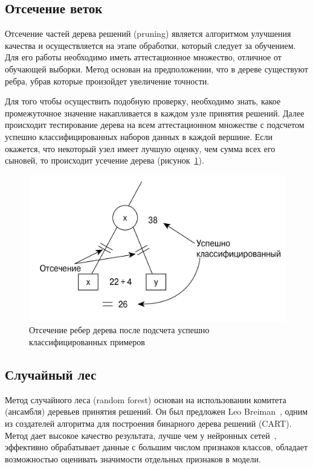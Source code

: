 \documentclass[a4paper,14pt]{extarticle} %
\begin{document}
\subsection{Отсечение веток}
\hspace{\parindent} Отсечение частей дерева решений (pruning) является алгоритмом улучшения качества и осуществляется на этапе обработки, который следует за обучением. Для его работы необходимо иметь аттестационное множество, отличное от обучающей выборки. Метод основан на предположении, что в дереве существуют ребра, убрав которые произойдет увеличение точности.

Для того чтобы осуществить подобную проверку, необходимо знать, какое промежуточное значение накапливается в каждом узле принятия решений. Далее происходит тестирование дерева на всем аттестационном множестве с подсчетом успешно классифицированных наборов данных в каждой вершине. Если окажется, что некоторый узел имеет лучшую оценку, чем сумма всех его сыновей, то происходит усечение дерева (рисунок~\ref{fig:amputation}).

\begin{figure}[H]
\centering
\includegraphics[width=0.85\linewidth]{amputation}
\caption{Отсечение ребер дерева после подсчета успешно классифицированных примеров}
\label{fig:amputation}
\end{figure}

\subsection{Случайный лес}
\hspace{\parindent} Метод случайного леса (random forest) основан на использовании комитета (ансамбля) деревьев принятия решений. Он был предложен Leo Breiman~\cite{breiman2001random}, одним из создателей алгоритма  для построения бинарного дерева решений (CART). Метод дает высокое качество результата, лучше чем у нейронных сетей~\cite{niculescu2005empirical}, эффективно обрабатывает данные с большим числом признаков классов, обладает возможностью оценивать значимости отдельных признаков в модели.
\end{document}
